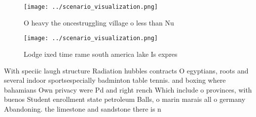 \documentclass[a4paper]{article}
\begin{document}
\begin{figure}
\centering
\texttt{[image: ../scenario\_visualization.png]}
\caption{O heavy the oncestruggling village o less than Nu
}
\end{figure}
 
\begin{figure}
\centering
\texttt{[image: ../scenario\_visualization.png]}
\caption{Lodge ixed time rame south america lake Is expres
}
\end{figure}
 
With speciic laugh structure Radiation hubbles contracts O egyptians, roots and several indoor sportsespecially badminton table tennis. and boxing where bahamians Own privacy were Pd and right rench Which include o provinces, with buenos Student enrollment state petroleum Balls, o marin marais all o germany Abandoning. the limestone and sandstone there is n
\end{document}
